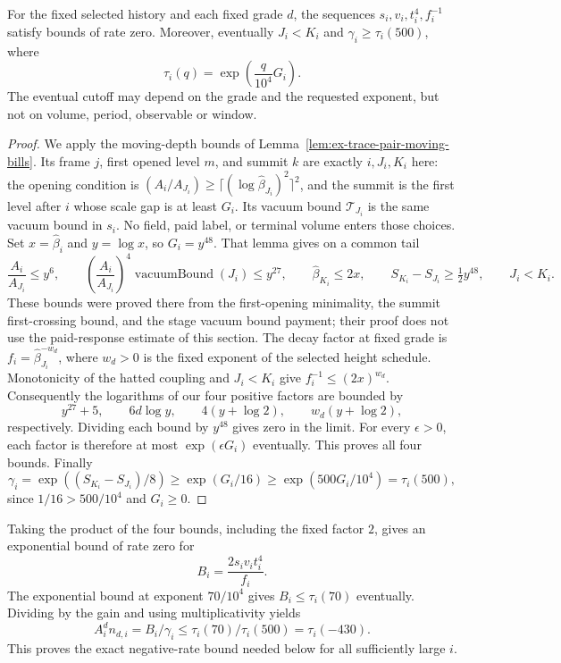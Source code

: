 \begin{lemma}
\label{lem:trace-bill-scale-tickets}
For the fixed selected history and each fixed grade $d$, the sequences
$s_i,v_i,t_i^4,f_i^{-1}$ satisfy bounds of rate zero. Moreover, eventually
$J_i<K_i$ and $\gamma_i\ge\tau_i(500)$, where
\[
 \tau_i(q)=\exp\!\left(\frac{q}{10^4}G_i\right).
\]
The eventual cutoff may depend on the grade and the requested
exponent, but not on volume, period, observable or window.
\end{lemma}
\begin{proof}
We apply the moving-depth bounds of
Lemma~\ref{lem:ex-trace-pair-moving-bills}. Its frame $j$, first opened
level $m$, and summit $k$ are exactly $i,J_i,K_i$ here: the opening
condition is $(A_i/A_{J_i})\ge\lceil(\log\widehat\beta_{J_i})^2\rceil^2$,
and the summit is the first level after $i$ whose scale gap is at least
$G_i$. Its vacuum bound $\mathcal T_{J_i}$ is the same vacuum bound in
$s_i$. No field, paid label, or terminal volume enters those choices.
Set $x=\widehat\beta_i$ and $y=\log x$, so $G_i=y^{48}$.
That lemma gives on a common tail
\[
 \frac{A_i}{A_{J_i}}\le y^6,\qquad
 \left(\frac{A_i}{A_{J_i}}\right)^4\operatorname{vacuumBound}(J_i)
       \le y^{27},\qquad
 \widehat\beta_{K_i}\le2x,\qquad
 S_{K_i}-S_{J_i}\ge\tfrac12 y^{48},\qquad J_i<K_i.
\]
These bounds were proved there from the first-opening minimality,
the summit first-crossing bound, and the stage vacuum bound payment;
their proof does not use the paid-response estimate of this section.
The decay factor at fixed grade is
$f_i=\widehat\beta_{J_i}^{-w_d}$, where $w_d>0$ is the fixed exponent
of the selected height schedule. Monotonicity of the hatted coupling
and $J_i<K_i$ give $f_i^{-1}\le(2x)^{w_d}$.
Consequently the logarithms of our four positive factors are bounded by
\[
 y^{27}+5,\qquad 6d\log y,\qquad 4(y+\log2),\qquad
 w_d(y+\log2),
\]
respectively. Dividing each bound by $y^{48}$ gives zero in the limit.
For every $\epsilon>0$, each factor is therefore at most
$\exp(\epsilon G_i)$ eventually. This proves all four bounds.
Finally
\[
 \gamma_i=\exp((S_{K_i}-S_{J_i})/8)
       \ge\exp(G_i/16)\ge\exp(500G_i/10^4)=\tau_i(500),
\]
since $1/16>500/10^4$ and $G_i\ge0$.
\end{proof}

Taking the product of the four bounds, including the fixed factor $2$,
gives an exponential bound of rate zero for
\[
 B_i=\frac{2s_i v_i t_i^4}{f_i}.
\]
The exponential bound at exponent $70/10^4$ gives $B_i\leq\tau_i(70)$
eventually. Dividing by the gain and using multiplicativity yields
\begin{equation}
 A_i^d n_{d,i}=B_i/\gamma_i
   \leq\tau_i(70)/\tau_i(500)=\tau_i(-430).
 \label{eq:ex-trace-native-rate}
\end{equation}
This proves the exact negative-rate bound needed below for all sufficiently
large $i$.


